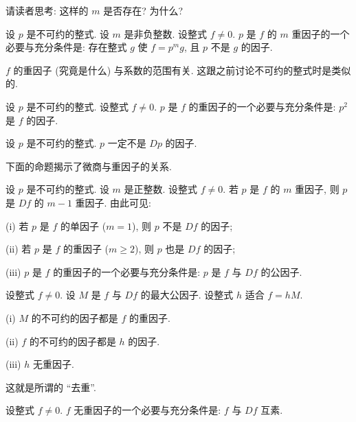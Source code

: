 \begin{remark}
    请读者思考: 这样的 $m$ 是否存在? 为什么?
\end{remark}

\begin{proposition}
    设 $p$ 是不可约的整式. 设 $m$ 是非负整数. 设整式 $f \neq 0$. $p$ 是 $f$ 的 $m$ 重因子的一个必要与充分条件是: 存在整式 $g$ 使 $f = p^m g$, 且 $p$ 不是 $g$ 的因子.
\end{proposition}

\begin{remark}
    $f$ 的重因子 (究竟是什么) 与系数的范围有关. 这跟之前讨论不可约的整式时是类似的.
\end{remark}

\begin{proposition}
    设 $p$ 是不可约的整式. 设整式 $f \neq 0$. $p$ 是 $f$ 的重因子的一个必要与充分条件是: $p^2$ 是 $f$ 的因子.
\end{proposition}

\begin{proposition}
    设 $p$ 是不可约的整式. $p$ 一定不是 $Dp$ 的因子.
\end{proposition}

下面的命题揭示了微商与重因子的关系.

\begin{proposition}
    设 $p$ 是不可约的整式. 设 $m$ 是正整数. 设整式 $f \neq 0$. 若 $p$ 是 $f$ 的 $m$ 重因子, 则 $p$ 是 $Df$ 的 $m-1$ 重因子. 由此可见:

    (i) 若 $p$ 是 $f$ 的单因子 ($m = 1$), 则 $p$ 不是 $Df$ 的因子;

    (ii) 若 $p$ 是 $f$ 的重因子 ($m \geq 2$), 则 $p$ 也是 $Df$ 的因子;

    (iii) $p$ 是 $f$ 的重因子的一个必要与充分条件是: $p$ 是 $f$ 与 $Df$ 的公因子.
\end{proposition}

\begin{proposition}
    设整式 $f \neq 0$. 设 $M$ 是 $f$ 与 $Df$ 的最大公因子. 设整式 $h$ 适合 $f = hM$.

    (i) $M$ 的不可约的因子都是 $f$ 的重因子.

    (ii) $f$ 的不可约的因子都是 $h$ 的因子.

    (iii) $h$ 无重因子.

    这就是所谓的 ``去重''.
\end{proposition}

\begin{proposition}
    设整式 $f \neq 0$. $f$ 无重因子的一个必要与充分条件是: $f$ 与 $Df$ 互素.
\end{proposition}

